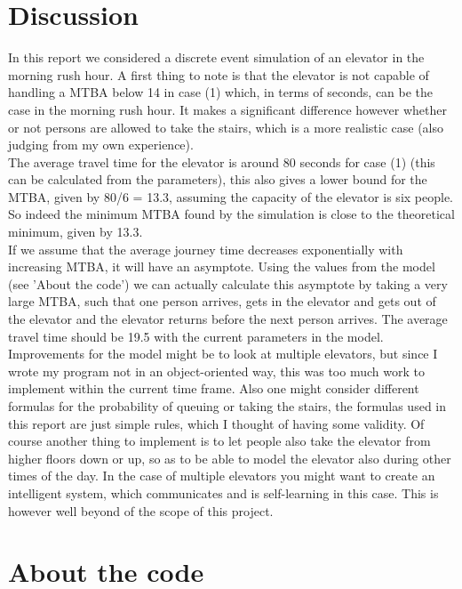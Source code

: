 \documentclass[10pt,a4paper]{article}
\begin{document}
\section{Discussion}

In this report we considered a discrete event simulation of an elevator in the morning rush hour. A first thing to note is that the elevator is not capable of handling a MTBA below 14 in case (1) which, in terms of seconds, can be the case in the morning rush hour. It makes a significant difference however whether or not persons are allowed to take the stairs, which is a more realistic case (also judging from my own experience).\\
The average travel time for the elevator is around 80 seconds for case (1) (this can be calculated from the parameters), this also gives a lower bound for the MTBA, given by 80/6 = 13.3, assuming the capacity of the elevator is six people. So indeed the minimum MTBA found by the simulation is close to the theoretical minimum, given by 13.3.\\
If we assume that the average journey time decreases exponentially with increasing MTBA, it will have an asymptote. Using the values from the model (see 'About the code') we can actually calculate this asymptote by taking a very large MTBA, such that one person arrives, gets in the elevator and gets out of the elevator and the elevator returns before the next person arrives. The average travel time should be 19.5 with the current parameters in the model.
\newline
\noindent Improvements for the model might be to look at multiple elevators, but since I wrote my program not in an object-oriented way, this was too much work to implement within the current time frame. Also one might consider different formulas for the probability of queuing or taking the stairs, the formulas used in this report are just simple rules, which I thought of having some validity. Of course another thing to implement is to let people also take the elevator from higher floors down or up, so as to be able to model the elevator also during other times of the day. In the case of multiple elevators you might want to create an intelligent system, which communicates and is self-learning in this case. This is however well beyond of the scope of this project.

\section{About the code}
\end{document}
